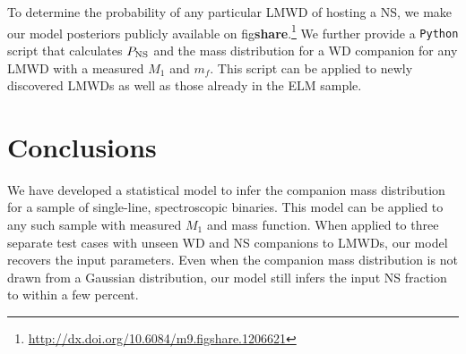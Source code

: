 \documentclass[apjl]{emulateapj}
\newcommand{\mf}{m_f}
\begin{document}




To determine the probability of any particular LMWD of hosting a NS, we make our model posteriors publicly available on fig{\bf share}.\footnote{\url{http://dx.doi.org/10.6084/m9.figshare.1206621}} We further provide a {\tt Python} script that calculates $P_{\rm NS}$ and the mass distribution for a WD companion for any LMWD with a measured $M_1$ and $\mf$. This script can be applied to newly discovered LMWDs as well as those already in the ELM sample.



\section{Conclusions}

We have developed a statistical model to infer the companion mass distribution for a sample of single-line, spectroscopic binaries. This model can be applied to any such sample with measured $M_1$ and mass function. When applied to three separate test cases with unseen WD and NS companions to LMWDs, our model recovers the input parameters. Even when the companion mass distribution is not drawn from a Gaussian distribution, our model still infers the input NS fraction to within a few percent.  
\end{document}
